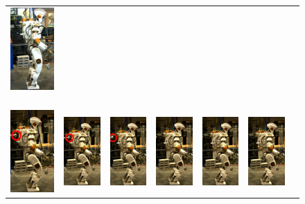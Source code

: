 \begin{figure}
\begin{tabular}{ccccccc}
    \includegraphics[width=0.7in]{STYLESTUFF/val7z_30} ~\\[2ex]
     \includegraphics[width=0.7in]{STYLESTUFF/val1dr_C} &
    \includegraphics[width=0.7in]{STYLESTUFF/val2dr_30} &
    \includegraphics[width=0.7in]{STYLESTUFF/val3dr_30} &
    \includegraphics[width=0.7in]{STYLESTUFF/val4d_30} &
    \includegraphics[width=0.7in]{STYLESTUFF/val5d_30} &
    \includegraphics[width=0.7in]{STYLESTUFF/val6d_30} &

\end{tabular}
\end{figure}
